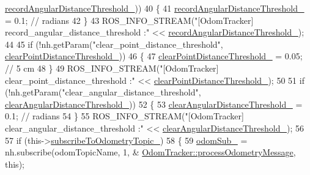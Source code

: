 \begin{DoxyCode}
      \hyperlink{classcl__move__base__z_1_1odom__tracker_1_1OdomTracker_a1274fe5334c109cd9c2339beb9411441}{recordAngularDistanceThreshold\_}))
40             \{
41                 \hyperlink{classcl__move__base__z_1_1odom__tracker_1_1OdomTracker_a1274fe5334c109cd9c2339beb9411441}{recordAngularDistanceThreshold\_} = 0.1; \textcolor{comment}{// radians}
42             \}
43             ROS\_INFO\_STREAM(\textcolor{stringliteral}{"[OdomTracker] record\_angular\_distance\_threshold :"} << 
      \hyperlink{classcl__move__base__z_1_1odom__tracker_1_1OdomTracker_a1274fe5334c109cd9c2339beb9411441}{recordAngularDistanceThreshold\_});
44 
45             \textcolor{keywordflow}{if} (!nh.getParam(\textcolor{stringliteral}{"clear\_point\_distance\_threshold"}, 
      \hyperlink{classcl__move__base__z_1_1odom__tracker_1_1OdomTracker_a7155d25d0e8dd9f237a79ff503b80e26}{clearPointDistanceThreshold\_}))
46             \{
47                 \hyperlink{classcl__move__base__z_1_1odom__tracker_1_1OdomTracker_a7155d25d0e8dd9f237a79ff503b80e26}{clearPointDistanceThreshold\_} = 0.05; \textcolor{comment}{// 5 cm}
48             \}
49             ROS\_INFO\_STREAM(\textcolor{stringliteral}{"[OdomTracker] clear\_point\_distance\_threshold :"} << 
      \hyperlink{classcl__move__base__z_1_1odom__tracker_1_1OdomTracker_a7155d25d0e8dd9f237a79ff503b80e26}{clearPointDistanceThreshold\_});
50 
51             \textcolor{keywordflow}{if} (!nh.getParam(\textcolor{stringliteral}{"clear\_angular\_distance\_threshold"}, 
      \hyperlink{classcl__move__base__z_1_1odom__tracker_1_1OdomTracker_a1b79dd86745adfb31db822e0c8106282}{clearAngularDistanceThreshold\_}))
52             \{
53                 \hyperlink{classcl__move__base__z_1_1odom__tracker_1_1OdomTracker_a1b79dd86745adfb31db822e0c8106282}{clearAngularDistanceThreshold\_} = 0.1; \textcolor{comment}{// radians}
54             \}
55             ROS\_INFO\_STREAM(\textcolor{stringliteral}{"[OdomTracker] clear\_angular\_distance\_threshold :"} << 
      \hyperlink{classcl__move__base__z_1_1odom__tracker_1_1OdomTracker_a1b79dd86745adfb31db822e0c8106282}{clearAngularDistanceThreshold\_});
56 
57             \textcolor{keywordflow}{if} (this->\hyperlink{classcl__move__base__z_1_1odom__tracker_1_1OdomTracker_afbe614b53a1493eb8268b8ea65b5b93a}{subscribeToOdometryTopic\_})
58             \{
59                 \hyperlink{classcl__move__base__z_1_1odom__tracker_1_1OdomTracker_ab55df0e91246e43dff80912dc35a4fee}{odomSub\_} = nh.subscribe(odomTopicName, 1, &
      \hyperlink{classcl__move__base__z_1_1odom__tracker_1_1OdomTracker_a12c5a839cfde2e8f2f55a5e0c9647b18}{OdomTracker::processOdometryMessage}, \textcolor{keyword}{this});

\end{DoxyCode}
